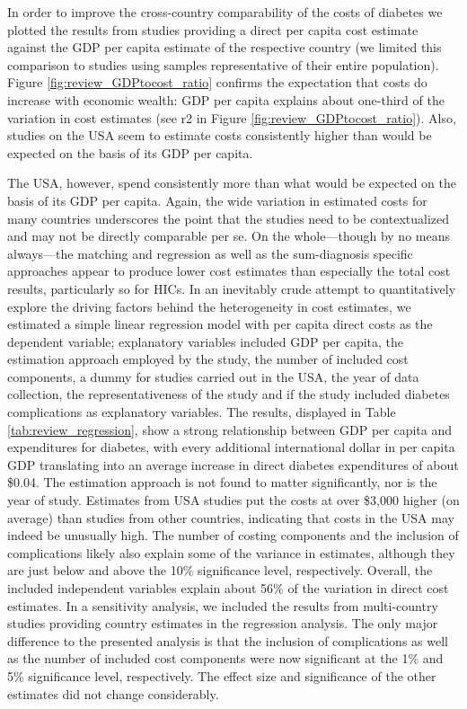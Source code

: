 In order to improve the cross-country comparability of the costs of diabetes we plotted the results from studies providing a direct per capita cost estimate against the \ac{GDP} per capita estimate of the respective country (we limited this comparison to studies using samples representative of their entire population). Figure \ref{fig:review_GDPtocost_ratio} confirms the expectation that costs do increase with economic wealth: \ac{GDP} per capita explains about one-third of the variation in cost estimates (see r2 in Figure \ref{fig:review_GDPtocost_ratio}). Also, studies on the USA seem to estimate costs consistently higher than would be expected on the basis of its \ac{GDP} per capita. 

The USA, however, spend consistently more than what would be expected on the basis of its \ac{GDP} per capita. Again, the wide variation in estimated costs for many countries underscores the point that the studies need to be contextualized and may not be directly comparable per se. On the whole---though by no means always---the matching and regression as well as the sum-diagnosis specific approaches appear to produce lower cost estimates than especially the total cost results, particularly so for \acp{HIC}. In an inevitably crude attempt to quantitatively explore the driving factors behind the heterogeneity in cost estimates, we estimated a simple linear regression model with per capita direct costs as the dependent variable; explanatory variables included \ac{GDP} per capita, the estimation approach employed by the study, the number of included cost components, a dummy for studies carried out in the USA, the year of data collection, the representativeness of the study and if the study included diabetes complications as explanatory variables. The results, displayed in Table \ref{tab:review_regression}, show a strong relationship between \ac{GDP} per capita and expenditures for diabetes, with every additional international dollar in per capita \ac{GDP} translating into an average increase in direct diabetes expenditures of about \$0.04. The estimation approach is not found to matter significantly, nor is the year of study. Estimates from USA studies put the costs at over \$3,000 higher (on average) than studies from other countries, indicating that costs in the USA may indeed be unusually high. The number of costing components and the inclusion of complications likely also explain some of the variance in estimates, although they are just below and above the 10\% significance level, respectively. Overall, the included independent variables explain about 56\% of the variation in direct cost estimates. In a sensitivity analysis, we included the results from multi-country
studies providing country estimates in the regression analysis. The
only major difference to the presented analysis is that the inclusion of
complications as well as the number of included cost components
were now significant at the 1\% and 5\% significance level, respectively.
The effect size and significance of the other estimates did not change
considerably.


